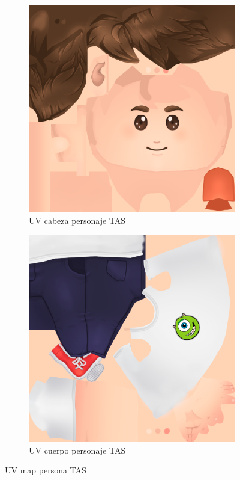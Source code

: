 \documentclass[12pt, a4paper,twoside,titlepage]{book}
\begin{document}
 
 \begin{figure}
\centering
\begin{subfigure}{.5\textwidth}
  \centering
  \includegraphics[width=.95\linewidth]{TGF/Artes/TAS_head.png}
  \caption{UV cabeza personaje TAS}
\end{subfigure}%
\begin{subfigure}{.5\textwidth}
  \centering
  \includegraphics[width=.95\linewidth]{TGF/Artes/TAS_body.png}
  \caption{UV cuerpo personaje TAS}
\end{subfigure}
\caption{UV map persona TAS}
\label{fig:ArtesTAS1}
\end{figure}
\end{document}

